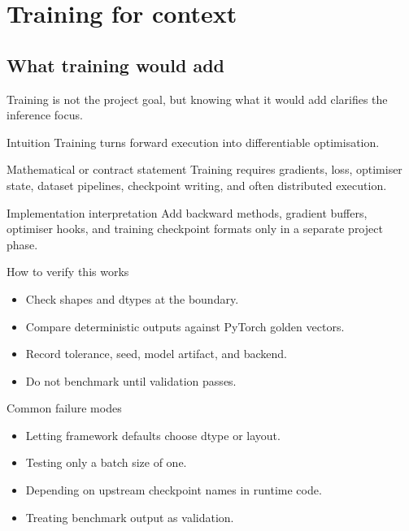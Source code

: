 \part{Training for context}

\chapter{What training would add}
\label{ch:training-adds}
Training is not the project goal, but knowing what it would add clarifies the inference focus.



\begin{intuitionbox}{Intuition}
Training turns forward execution into differentiable optimisation.
\end{intuitionbox}

\begin{definitionbox}{Mathematical or contract statement}
Training requires gradients, loss, optimiser state, dataset pipelines, checkpoint writing, and often distributed execution.
\end{definitionbox}

\begin{implementationbox}{Implementation interpretation}
Add backward methods, gradient buffers, optimiser hooks, and training checkpoint formats only in a separate project phase.
\end{implementationbox}

\begin{verificationbox}{How to verify this works}
\begin{itemize}
\item Check shapes and dtypes at the boundary.
\item Compare deterministic outputs against PyTorch golden vectors.
\item Record tolerance, seed, model artifact, and backend.
\item Do not benchmark until validation passes.
\end{itemize}
\end{verificationbox}

\begin{warningbox}{Common failure modes}
\begin{itemize}
\item Letting framework defaults choose dtype or layout.
\item Testing only a batch size of one.
\item Depending on upstream checkpoint names in runtime code.
\item Treating benchmark output as validation.
\end{itemize}
\end{warningbox}

